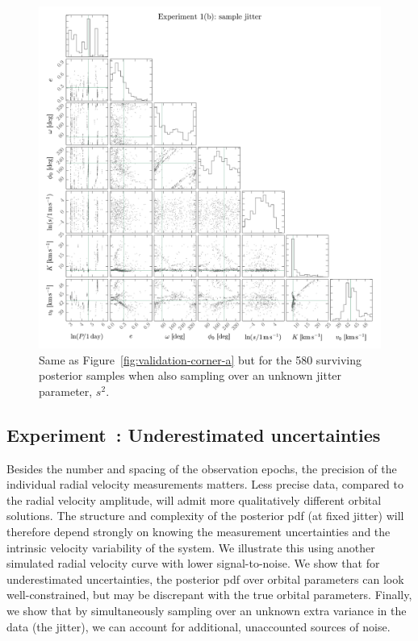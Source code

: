 \documentclass[manuscript, letterpaper]{aastex6}
\newcommand{\figname}{Figure}
\newcounter{expcounter}
\begin{document}
\begin{figure}[p]
\begin{center}
\includegraphics[width=\textwidth]{figures/validation-corner-b.pdf}
\end{center}
\caption{%
Same as \figname~\ref{fig:validation-corner-a} but for the 580 surviving posterior
samples when also sampling over an unknown jitter parameter, $s^2$.
\label{fig:validation-corner-b}}
\end{figure}

\subsection{Experiment~: Underestimated uncertainties}
\label{sec:undunc}
Besides the number and spacing of the observation epochs, the
precision of the individual radial velocity measurements matters.
Less precise data, compared to the radial velocity amplitude,
will admit more qualitatively different orbital solutions.
The structure and complexity of the posterior pdf (at fixed jitter) will
therefore depend strongly on knowing the measurement uncertainties and
the intrinsic velocity variability of the system.
We illustrate this using another simulated radial velocity curve with
lower signal-to-noise. We show that for underestimated uncertainties,
the posterior pdf over orbital parameters can look well-constrained, but may be
discrepant with the true orbital parameters.
Finally, we show that by simultaneously sampling over an unknown extra variance in
the data (the jitter), we can account for additional, unaccounted sources of noise.
\end{document}

